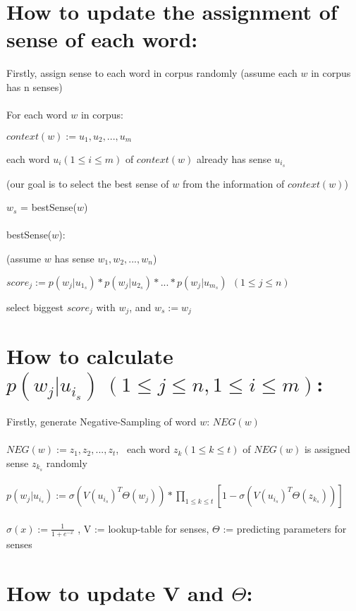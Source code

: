\documentclass{scrartcl}
\begin{document}
\hfill

\section{How to update the assignment of sense of each word:}

	Firstly, assign sense to each word in corpus randomly (assume each $w$ in corpus has n senses)\\
\\
	For each word $w$ in corpus:

		$context(w) := u_1, u_2, ... , u_m$

		each word $u_i(1\leq i\leq m)$ of $context(w)$ already has sense $u_{i_s}$

		(our goal is to select the best sense of $w$ from the information of $context(w)$)
	
		$w_s$ = bestSense($w$) \\
\\
		bestSense($w$):
		
			(assume $w$ has sense $ w_1, w_2, ..., w_n$)
		
			$score_j := p(w_j | u_{1_s}) * p(w_j | u_{2_s}) * ... * p(w_j | u_{m_s}) \ \ (1 \leq j \leq n)$
		
			select biggest $score_j$ with $w_j$, and $w_s := w_j$

\hfill

\section{How to calculate $p(w_j | u_{i_s}) \ (1 \leq j \leq n, 1\leq i\leq m)$:}
	
	Firstly, generate Negative-Sampling of word $w$: $NEG(w)$\\
\\
	$NEG(w) := z_1, z_2, ... , z_t$, \ each word $z_k(1\leq k \leq t)$ of $NEG(w)$ is assigned sense $z_{k_s}$ randomly\\
\\
	$p(w_j | u_{i_s}) := \sigma(V(u_{i_s})^T \Theta (w_j)) * \prod_{1\leq k \leq t} [1 - \sigma(V(u_{i_s})^T \Theta(z_{k_s}))]$\\
\\
$\sigma(x) := \frac{1}{1+e^{-x}}$  , V := lookup-table for senses, $\Theta$ := predicting parameters for senses

\hfill

\section{How to update V and $\Theta$:}
\end{document}
